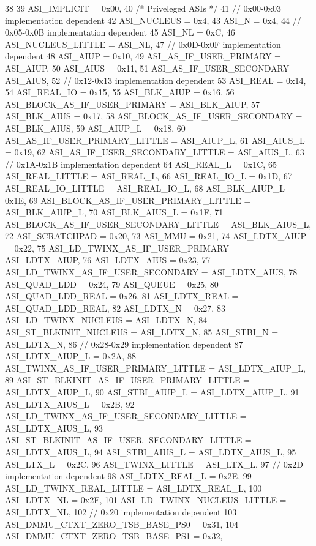 \begin{DoxyCode}
38          {
39     ASI_IMPLICIT = 0x00,
40     /* Priveleged ASIs */
41     // 0x00-0x03 implementation dependent
42     ASI_NUCLEUS = 0x4,
43     ASI_N = 0x4,
44     // 0x05-0x0B implementation dependent
45     ASI_NL = 0xC,
46     ASI_NUCLEUS_LITTLE = ASI_NL,
47     // 0x0D-0x0F implementation dependent
48     ASI_AIUP = 0x10,
49     ASI_AS_IF_USER_PRIMARY = ASI_AIUP,
50     ASI_AIUS = 0x11,
51     ASI_AS_IF_USER_SECONDARY = ASI_AIUS,
52     // 0x12-0x13 implementation dependent
53     ASI_REAL = 0x14,
54     ASI_REAL_IO = 0x15,
55     ASI_BLK_AIUP = 0x16,
56     ASI_BLOCK_AS_IF_USER_PRIMARY = ASI_BLK_AIUP,
57     ASI_BLK_AIUS = 0x17,
58     ASI_BLOCK_AS_IF_USER_SECONDARY = ASI_BLK_AIUS,
59     ASI_AIUP_L = 0x18,
60     ASI_AS_IF_USER_PRIMARY_LITTLE = ASI_AIUP_L,
61     ASI_AIUS_L = 0x19,
62     ASI_AS_IF_USER_SECONDARY_LITTLE = ASI_AIUS_L,
63     // 0x1A-0x1B implementation dependent
64     ASI_REAL_L = 0x1C,
65     ASI_REAL_LITTLE = ASI_REAL_L,
66     ASI_REAL_IO_L = 0x1D,
67     ASI_REAL_IO_LITTLE = ASI_REAL_IO_L,
68     ASI_BLK_AIUP_L = 0x1E,
69     ASI_BLOCK_AS_IF_USER_PRIMARY_LITTLE = ASI_BLK_AIUP_L,
70     ASI_BLK_AIUS_L = 0x1F,
71     ASI_BLOCK_AS_IF_USER_SECONDARY_LITTLE = ASI_BLK_AIUS_L,
72     ASI_SCRATCHPAD = 0x20,
73     ASI_MMU = 0x21,
74     ASI_LDTX_AIUP = 0x22,
75     ASI_LD_TWINX_AS_IF_USER_PRIMARY = ASI_LDTX_AIUP,
76     ASI_LDTX_AIUS = 0x23,
77     ASI_LD_TWINX_AS_IF_USER_SECONDARY = ASI_LDTX_AIUS,
78     ASI_QUAD_LDD = 0x24,
79     ASI_QUEUE = 0x25,
80     ASI_QUAD_LDD_REAL = 0x26,
81     ASI_LDTX_REAL = ASI_QUAD_LDD_REAL,
82     ASI_LDTX_N = 0x27,
83     ASI_LD_TWINX_NUCLEUS = ASI_LDTX_N,
84     ASI_ST_BLKINIT_NUCLEUS = ASI_LDTX_N,
85     ASI_STBI_N = ASI_LDTX_N,
86     // 0x28-0x29 implementation dependent
87     ASI_LDTX_AIUP_L = 0x2A,
88     ASI_TWINX_AS_IF_USER_PRIMARY_LITTLE = ASI_LDTX_AIUP_L,
89     ASI_ST_BLKINIT_AS_IF_USER_PRIMARY_LITTLE = ASI_LDTX_AIUP_L,
90     ASI_STBI_AIUP_L = ASI_LDTX_AIUP_L,
91     ASI_LDTX_AIUS_L = 0x2B,
92     ASI_LD_TWINX_AS_IF_USER_SECONDARY_LITTLE = ASI_LDTX_AIUS_L,
93     ASI_ST_BLKINIT_AS_IF_USER_SECONDARY_LITTLE = ASI_LDTX_AIUS_L,
94     ASI_STBI_AIUS_L = ASI_LDTX_AIUS_L,
95     ASI_LTX_L = 0x2C,
96     ASI_TWINX_LITTLE = ASI_LTX_L,
97     // 0x2D implementation dependent
98     ASI_LDTX_REAL_L = 0x2E,
99     ASI_LD_TWINX_REAL_LITTLE = ASI_LDTX_REAL_L,
100     ASI_LDTX_NL = 0x2F,
101     ASI_LD_TWINX_NUCLEUS_LITTLE = ASI_LDTX_NL,
102     // 0x20 implementation dependent
103     ASI_DMMU_CTXT_ZERO_TSB_BASE_PS0 = 0x31,
104     ASI_DMMU_CTXT_ZERO_TSB_BASE_PS1 = 0x32,
}
\end{DoxyCode}
